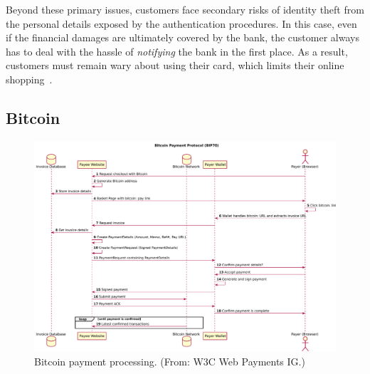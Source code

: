 \documentclass{llncs}
\begin{document}
Beyond these primary issues, customers face secondary risks of
identity theft from the personal details exposed by the authentication
procedures. In this case, even if the financial damages are ultimately
covered by the bank, the customer always has to deal with the hassle
of {\em notifying} the bank in the first place.  As a result,
customers must remain wary about using their card, which limits their
online shopping~\cite[p. 50]{ibi2014}.
%



\subsection{Bitcoin}

\begin{figure}[b!]
\includegraphics[width=\textwidth]{figs/bitcoin.pdf}
\caption{Bitcoin payment processing. (From: W3C Web Payments IG.)}
\label{fig:bitcoin}
\end{figure}
\end{document}
